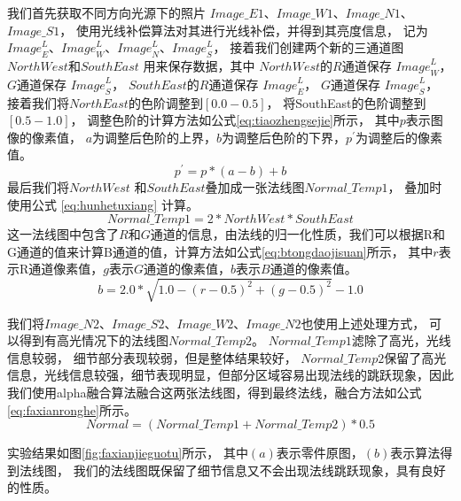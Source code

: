我们首先获取不同方向光源下的照片
$Image\_E1$、$Image\_W1$、$Image\_N1$、$Image\_S1$，
使用光线补偿算法对其进行光线补偿，并得到其亮度信息，
记为
${Image}_E^L$、${Image}_W^L$、${Image}_N^L$、${Image}_S^L$，
接着我们创建两个新的三通道图
$NorthWest$和$SouthEast$
用来保存数据，其中
$NorthWest$的$R$通道保存
${Image}_W^L$，
$G$通道保存
${Image}_S^L$，
$SouthEast$的$R$通道保存
${Image}_E^L$，
$G$通道保存
${Image}_S^L$，
接着我们将$NorthEast$的色阶调整到$[0.0-0.5]$，
将SouthEast的色阶调整到$[0.5-1.0]$，
调整色阶的计算方法如公式\eqref{eq:tiaozhengsejie}所示，
其中$p$表示图像的像素值，
$a$为调整后色阶的上界，$b$为调整后色阶的下界，${p}^{'}$为调整后的像素值。
\begin{equation}
\label{eq:tiaozhengsejie}
{p}^{'}=p* (a-b)+b
\end{equation}
最后我们将$NorthWest$
和$SouthEast$叠加成一张法线图$Normal\_Temp1$，
叠加时使用公式
\eqref{eq:hunhetuxiang}
计算。
\begin{equation}
\label{eq:hunhetuxiang}
Normal\_Temp1=2* NorthWest* SouthEast
\end{equation}
这一法线图中包含了$R$和$G$通道的信息，由法线的归一化性质，我们可以根据R和G通道的值来计算B通道的值，计算方法如公式\eqref{eq:btongdaojisuan}所示，
其中$r$表示R通道像素值，$g$表示$G$通道的像素值，$b$表示$B$通道的像素值。
\begin{equation}
\label{eq:btongdaojisuan}
b=2.0* \sqrt{1.0-{(r-0.5)}^2+{(g-0.5)}^2}-1.0
\end{equation}

我们将$Image\_N2$、$Image\_S2$、$Image\_W2$、$Image\_N2$也使用上述处理方式，
可以得到有高光情况下的法线图$Normal\_Temp2$。
$Normal\_Temp1$滤除了高光，光线信息较弱，
细节部分表现较弱，但是整体结果较好，
$Normal\_Temp2$保留了高光信息，光线信息较强，细节表现明显，但部分区域容易出现法线的跳跃现象，因此我们使用alpha融合算法融合这两张法线图，得到最终法线，融合方法如公式
\eqref{eq:faxianronghe}所示。
\begin{equation}
\label{eq:faxianronghe}
Normal=(Normal\_Temp1+Normal\_Temp2)* 0.5
\end{equation}

实验结果如图\ref{fig:faxianjieguotu}所示，
其中$(a)$表示零件原图，$(b)$表示算法得到法线图，
我们的法线图既保留了细节信息又不会出现法线跳跃现象，具有良好的性质。

